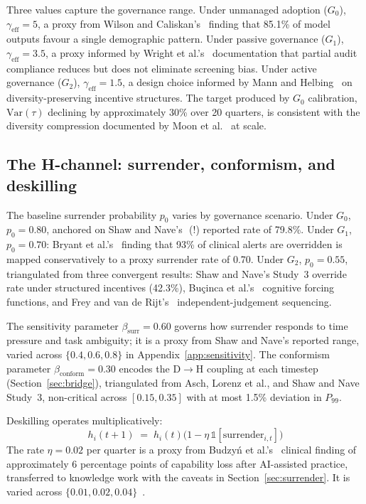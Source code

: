 \documentclass[11pt,a4paper]{article}
\newcommand{\ind}{\mathbb{1}}   %
\begin{document}
Three values capture the governance range.
Under unmanaged adoption ($G_0$), $\gamma_{\text{eff}} = 5$, a proxy from
Wilson and Caliskan's~\cite{wilson_aies_2024} finding that 85.1\% of model
outputs favour a single demographic pattern.
Under passive governance ($G_1$), $\gamma_{\text{eff}} = 3.5$, a proxy
informed by Wright et al.'s~\cite{wright_facct_2024} documentation that
partial audit compliance reduces but does not eliminate screening bias.
Under active governance ($G_2$), $\gamma_{\text{eff}} = 1.5$, a design
choice informed by Mann and Helbing~\cite{mann_pnas_2017} on
diversity-preserving incentive structures.
The target produced by $G_0$ calibration, $\text{Var}(\tau)$ declining by
approximately 30\% over 20 quarters, is consistent with the diversity
compression documented by Moon et al.~\cite{moon_chbai_2025} at scale.

\subsection{The H-channel: surrender, conformism, and deskilling}

The baseline surrender probability $p_0$ varies by governance scenario.
Under $G_0$, $p_0 = 0.80$, anchored on Shaw and
Nave's~\cite{shaw_psyarxiv_2026}\,(!) reported rate of 79.8\%\cite{bridgers_arxiv_2024}. Under $G_1$,
$p_0 = 0.70$: Bryant et al.'s~\cite{bryant_aci_2014} finding that 93\% of
clinical alerts are overridden is mapped conservatively to a proxy surrender
rate of 0.70. Under $G_2$, $p_0 = 0.55$, triangulated from three convergent
results: Shaw and Nave's Study~3 override rate under structured incentives
(42.3\%), Bu\c{c}inca et al.'s~\cite{bucinca_chi_2021} cognitive forcing
functions, and Frey and van de Rijt's~\cite{frey_mnsc_2021}
independent-judgement sequencing.

The sensitivity parameter $\beta_{\text{surr}} = 0.60$ governs how surrender
responds to time pressure and task ambiguity; it is a proxy from Shaw and
Nave's reported range, varied across $\{0.4, 0.6, 0.8\}$ in
Appendix~\ref{app:sensitivity}. The conformism parameter
$\beta_{\text{conform}} = 0.30$ encodes the D$\rightarrow$H coupling at each
timestep (Section~\ref{sec:bridge}), triangulated from Asch, Lorenz et al.,
and Shaw and Nave Study~3, non-critical across $[0.15, 0.35]$ with at most
1.5\% deviation in $P_{99}$.

Deskilling operates multiplicatively:
\[
  h_i(t{+}1) \;=\; h_i(t)\bigl(1 - \eta\,\ind[\text{surrender}_{i,t}]\bigr)
\]
The rate $\eta = 0.02$ per quarter is a proxy from Budzy\'{n} et
al.'s~\cite{budzyn_lancetgh_2025} clinical finding of approximately 6
percentage points of capability loss after AI-assisted practice, transferred
to knowledge work with the caveats in Section~\ref{sec:surrender}. It is
varied across $\{0.01, 0.02, 0.04\}$~\cite{arthur_hp_1998}.
\end{document}
